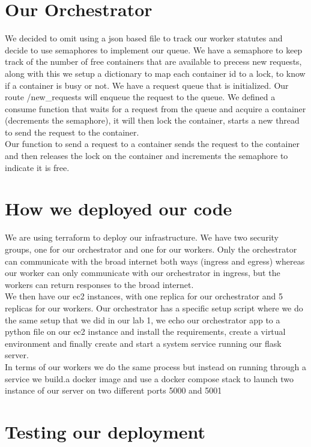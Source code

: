 \documentclass[11pt]{article}
\begin{document}
\section{Our Orchestrator}
We decided to omit using a json based file to track our worker statutes and decide to use semaphores to implement our queue. We have a semaphore to keep track of the number of free containers that are available to precess new requests, along with this we setup a dictionary to map each container id to a lock, to know if a container is busy or not. We have a request queue that is initialized. Our route /new\_requests will enqueue the request to the queue. We defined a consume function that waits for a request from the queue and acquire a container (decrements the semaphore), it will then lock the container, starts a new thread to send the request to the container.
\newline
\\
Our function to send a request to a container sends the request to the container and then releases the lock on the container and increments the semaphore to indicate it is free.

\section{How we deployed our code}
We are using terraform to deploy our infrastructure. We have two security groups, one for our orchestrator and one for our workers. Only the orchestrator can communicate with the broad internet both ways (ingress and egress) whereas our worker can only communicate with our orchestrator in ingress, but the workers can return responses to the broad internet.
\newline
\\
We then have our ec2 instances, with one replica for our orchestrator and 5 replicas for our workers. Our orchestrator has a specific setup script where we do the same setup that we did in our lab 1, we echo our orchestrator app to a python file on our ec2 instance and install the requirements, create a virtual environment and finally create and start a system service running our flask server.
\newline
\\
In terms of our workers we do the same process but instead on running through a service we build.a docker image and use a docker compose stack to launch two instance of our server on two different ports 5000 and 5001

\section{Testing our deployment}
\end{document}
